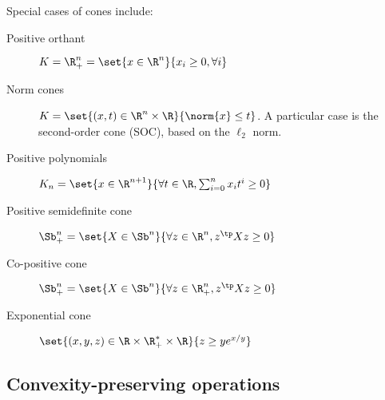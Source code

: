 Special cases of cones include:
\begin{description}
    \item[Positive orthant] $K = \R_+^n = \set{x\in\R^n}{x_i\geq 0, \forall i}$
    \item[Norm cones] $K = \set{(x, t)\in\R^n\times\R}{\norm{x}\leq t}$. A particular case is the second-order cone (SOC), based on the $\ell_2$ norm.
    \item[Positive polynomials] $K_n = \set{x\in\R^{n+1}}{\forall t\in\R, \sum_{i=0}^n x_i t^i \geq 0}$
    \item[Positive semidefinite cone] $\Sb^n_+ = \set{X\in\Sb^n}{\forall z\in\R^n, z^\tp Xz\geq0}$ 
    \item[Co-positive cone] $\Sb^n_+ = \set{X\in\Sb^n}{\forall z\in\R^n_+, z^\tp Xz\geq0}$ 
    \item[Exponential cone] $\set{(x,y,z)\in\R\times\R_+^*\times\R}{z\geq ye^{x/y}}$ 
\end{description}

\subsection{Convexity-preserving operations}